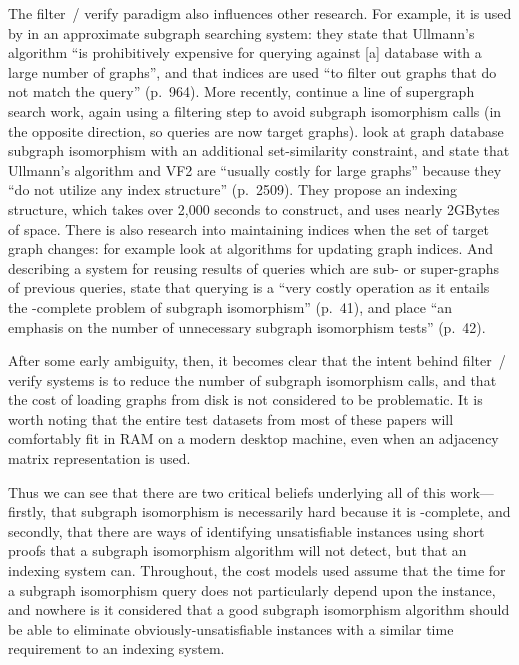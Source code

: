 \documentclass[twoside,11pt]{article}
\begin{document}
The filter~/ verify paradigm also influences other research. For example, it is used by
 in an approximate subgraph searching system: they state that
Ullmann's algorithm ``is prohibitively expensive for querying against [a] database with a large
number of graphs'', and that indices are used ``to filter out graphs that do not match the query''
(p.\ 964).  More recently,  continue a line of supergraph search work, again
using a filtering step to avoid subgraph isomorphism calls (in the opposite direction, so queries
are now target graphs).  look at graph database subgraph
isomorphism with an additional set-similarity constraint, and state that Ullmann's algorithm and VF2
are ``usually costly for large graphs'' because they ``do not utilize any index structure'' (p.\
2509). They propose an indexing structure, which takes over 2,000 seconds to construct, and uses nearly 2GBytes
of space.  There is also research into maintaining indices when the set of target graph changes: for
example \citeA{DBLP:conf/sigmod/YuanMYG15} look at algorithms for updating graph indices.
And describing a system for reusing results of queries which are sub- or super-graphs of previous
queries, \citeA{DBLP:conf/edbt/WangNT16} state that querying is a ``very costly operation as it
entails the \NP-complete problem of subgraph isomorphism'' (p.\ 41), and place ``an emphasis on the
number of unnecessary subgraph isomorphism tests'' (p.\ 42).

After some early ambiguity, then, it becomes clear that the intent behind filter~/ verify systems is
to reduce the number of subgraph isomorphism calls, and that the cost of loading graphs from disk is
not considered to be problematic. It is worth noting that the entire test datasets from most of
these papers will comfortably fit in RAM on a modern desktop machine, even when an adjacency matrix
representation is used.

Thus we can see that there are two critical beliefs underlying all of this work---firstly, that
subgraph isomorphism is necessarily hard because it is \NP-complete, and secondly, that there are
ways of identifying unsatisfiable instances using short proofs that a subgraph isomorphism algorithm
will not detect, but that an indexing system can. Throughout, the cost models used assume that the
time for a subgraph isomorphism query does not particularly depend upon the instance, and nowhere is
it considered that a good subgraph isomorphism algorithm should be able to eliminate
obviously-unsatisfiable instances with a similar time requirement to an indexing system.
\end{document}
